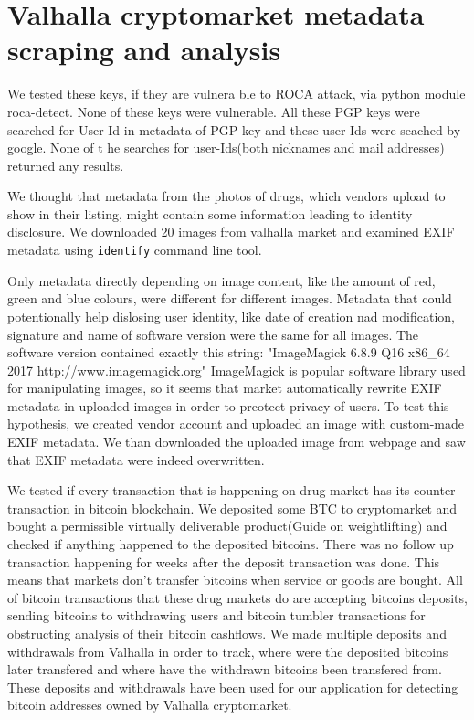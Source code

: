 \documentclass[
  digital, %
  table,   %
  lof,     %
  lot,     %
  oneside
]{fithesis3}
\begin{document}
\section{Valhalla cryptomarket metadata scraping and analysis}

We tested these keys, if they are vulnera ble to ROCA attack, via python module roca-detect. None of these keys were vulnerable.
All these PGP keys were searched for User-Id in metadata of PGP key and these user-Ids were seached by google. None of t
he searches for user-Ids(both nicknames and mail addresses) returned any results.

We thought that metadata from the photos of drugs, which vendors upload
to show in their listing, might contain some information leading to identity disclosure.
We downloaded 20 images from valhalla market and examined 
EXIF metadata using \texttt{identify} command line tool.

Only metadata directly depending on image content, like the amount of red, green and blue colours,
were different for different images.
Metadata that could potentionally help dislosing user identity,
like date of creation nad modification, signature and name of software version were the same for all images.
The software version contained exactly this string:
"ImageMagick 6.8.9 Q16 x86\_64 2017 http://www.imagemagick.org"
ImageMagick is popular software library used for manipulating images, so it seems
that market automatically rewrite EXIF metadata in uploaded images in order to preotect privacy of users.
To test this hypothesis, we created vendor account and uploaded an image with
custom-made EXIF metadata. We than downloaded the uploaded image from webpage and 
saw that EXIF metadata were indeed overwritten.

We tested if every transaction that is happening on drug market has its counter transaction
in bitcoin blockchain.
We deposited some BTC to cryptomarket and bought a permissible virtually deliverable
product(Guide on weightlifting) and checked if anything happened to the deposited bitcoins.
There was no follow up transaction happening for weeks after the deposit transaction was done.
This means that markets don't transfer bitcoins when service or goods are bought.
All of bitcoin transactions that these drug markets do 
are accepting bitcoins deposits,
sending bitcoins to withdrawing users and bitcoin tumbler transactions for
obstructing analysis of their bitcoin cashflows.
We made multiple deposits and withdrawals from Valhalla in order to track,
where were the deposited bitcoins later transfered and where have the withdrawn
bitcoins been transfered from. These deposits and withdrawals have been
used for our application for detecting bitcoin addresses owned by Valhalla cryptomarket.
\end{document}

